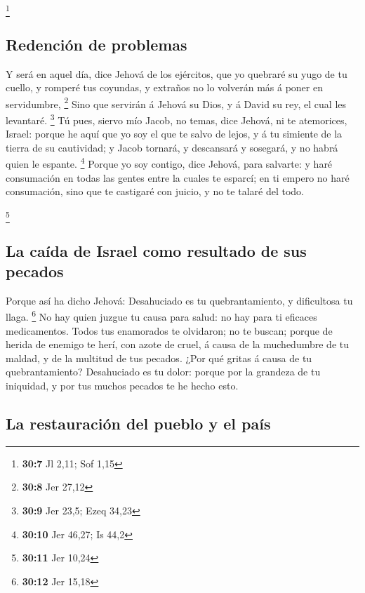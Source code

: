 \footnote{\textbf{30:7} Jl 2,11; Sof 1,15}

\hypertarget{redenciuxf3n-de-problemas}{%
\subsection{Redención de problemas}\label{redenciuxf3n-de-problemas}}

 Y será en aquel día, dice Jehová de los ejércitos, que yo
quebraré su yugo de tu cuello, y romperé tus coyundas, y extraños no lo
volverán más á poner en servidumbre, \footnote{\textbf{30:8} Jer 27,12}
 Sino que servirán á Jehová su Dios, y á David su rey, el
cual les levantaré. \footnote{\textbf{30:9} Jer 23,5; Ezeq 34,23}
 Tú pues, siervo mío Jacob, no temas, dice Jehová, ni te
atemorices, Israel: porque he aquí que yo soy el que te salvo de lejos,
y á tu simiente de la tierra de su cautividad; y Jacob tornará, y
descansará y sosegará, y no habrá quien le espante. \footnote{\textbf{30:10}
  Jer 46,27; Is 44,2}  Porque yo soy contigo, dice
Jehová, para salvarte: y haré consumación en todas las gentes entre la
cuales te esparcí; en ti empero no haré consumación, sino que te
castigaré con juicio, y no te talaré del todo.

\footnote{\textbf{30:11} Jer 10,24}

\hypertarget{la-cauxedda-de-israel-como-resultado-de-sus-pecados}{%
\subsection{La caída de Israel como resultado de sus
pecados}\label{la-cauxedda-de-israel-como-resultado-de-sus-pecados}}

 Porque así ha dicho Jehová: Desahuciado es tu
quebrantamiento, y dificultosa tu llaga. \footnote{\textbf{30:12} Jer
  15,18}  No hay quien juzgue tu causa para salud: no hay
para ti eficaces medicamentos.  Todos tus enamorados te
olvidaron; no te buscan; porque de herida de enemigo te herí, con azote
de cruel, á causa de la muchedumbre de tu maldad, y de la multitud de
tus pecados.  ¿Por qué gritas á causa de tu
quebrantamiento? Desahuciado es tu dolor: porque por la grandeza de tu
iniquidad, y por tus muchos pecados te he hecho esto.

\hypertarget{la-restauraciuxf3n-del-pueblo-y-el-pauxeds}{%
\subsection{La restauración del pueblo y el
país}\label{la-restauraciuxf3n-del-pueblo-y-el-pauxeds}}

